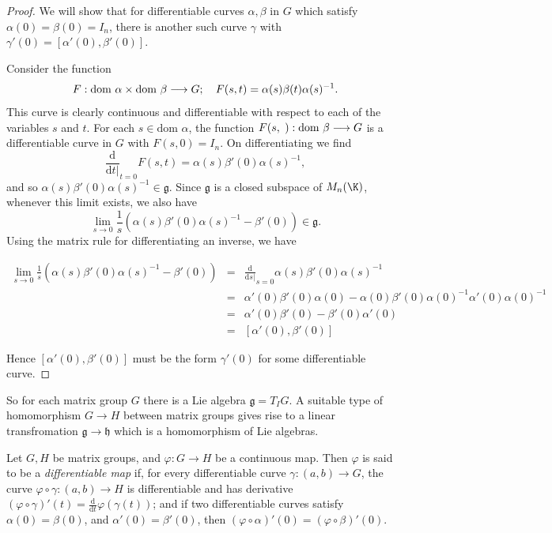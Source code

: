 \begin{proof}
  We will show that for differentiable curves \(\alpha,\beta\) in \(G\) which satisfy
  \(\alpha(0)=\beta(0)=I_n\), there is another such curve \(\gamma\) with \(\gamma'(0)=[\alpha'(0),\beta'(0)]\).

  Consider the function
  \[ F:\text{dom }\alpha\times\text{dom }\beta\longrightarrow G;\hspace{10px}F(s,t)=\alpha(s)\beta(t)\alpha(s)^{-1}. \]
  This curve is clearly continuous and differentiable with respect to each of the variables
  \(s\) and \(t\). For each \(s\in\text{dom }\alpha\), the function \(F(s,\hspace{3px}):\text{dom }\beta\longrightarrow G\)
  is a differentiable curve in \(G\) with \(F(s,0)=I_n\). On differentiating we find
  \[\frac{\text{d}}{\text{d}t|}_{t=0}F(s,t)=\alpha(s)\beta'(0)\alpha(s)^{-1}, \]
  and so \(\alpha(s)\beta'(0)\alpha(s)^{-1} \in \mathfrak{g}\). Since \(\mathfrak{g}\) is a
  closed subspace of \(M_n(\K)\), whenever this limit exists, we also have
  \[ \lim_{s\rightarrow 0}\frac{1}{s}(\alpha(s)\beta'(0)\alpha(s)^{-1}-\beta'(0))\in\mathfrak{g}. \]
  Using the matrix rule for differentiating an inverse, we have

  \begin{eqnarray*}
    \lim_{s\rightarrow0}\frac{1}{s}(\alpha(s)\beta'(0)\alpha(s)^{-1}-\beta'(0))
    &=& \frac{\text{d}}{\text{d}s|}_{s=0} \alpha(s)\beta'(0)\alpha(s)^{-1} \\
    &=& \alpha'(0)\beta'(0)\alpha(0)-\alpha(0)\beta'(0)\alpha(0)^{-1}\alpha'(0)\alpha(0)^{-1} \\
    &=& \alpha'(0)\beta'(0)-\beta'(0)\alpha'(0) \\
    &=& [\alpha'(0),\beta'(0)]
  \end{eqnarray*}

  Hence \([\alpha'(0),\beta'(0)]\) must be the form \(\gamma'(0)\) for some differentiable curve.
\end{proof}

So for each matrix group \(G\) there is a Lie algebra \(\mathfrak{g}=T_IG\). A suitable type
of homomorphism \(G\longrightarrow H\) between matrix groups gives rise to a linear
transfromation \(\mathfrak{g}\longrightarrow\mathfrak{h}\) which is a homomorphism of Lie
algebras.

\begin{definition}
  Let \(G,H\) be matrix groups, and \(\varphi:G\longrightarrow H\) be a continuous map.
  Then \(\varphi\) is said to be a {\it differentiable map} if, for every differentiable curve
  \(\gamma:(a,b)\longrightarrow G\), the curve \(\varphi\circ\gamma:(a,b)\longrightarrow H\)
  is differentiable and has derivative \((\varphi\circ\gamma)'(t)=\frac{\text{d}}{\text{d}t}\varphi(\gamma(t))\);
  and if two differentiable curves satisfy \(\alpha(0)=\beta(0)\), and \(\alpha'(0)=\beta'(0)\),
  then \((\varphi\circ\alpha)'(0)=(\varphi\circ\beta)'(0)\).
\end{definition}

